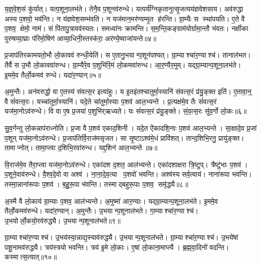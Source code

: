 य॒ज्ञ॒वे॒श॒सं कु॑र्यात्।
यत्प॒शूना॒लभ॑ते।
तेनै॒व प॒शूनव॑रुन्धे।
यत्पर्य॑ग्निकृतानुत्सृ॒जत्यय॑ज्ञवेशसाय।
अव॑रुद्धा अस्य प॒शवो॒ भव॑न्ति।
न य॑ज्ञवेश॒सम्भ॑वति।
न यज॑मान॒मर॑ण्यम्मृ॒त ह॑रन्ति।
ग्रा॒म्यैः स स्था॑पयति।
ए॒ते वै प॒शव॒ क्षेमो॒ नाम॑।
सं पि॑तापु॒त्रावव॑स्यतः।
समध्वा॑नः क्रामन्ति।
स॒म॒न्ति॒कङ्ग्राम॑योर्ग्रामा॒न्तौ भ॑वतः।
नर्क्षीका पुरुषव्या॒घ्राः प॑रिमो॒षिण॑ आव्या॒धिनी॒स्तस्क॑रा॒ अर॑ण्ये॒ष्वाजा॑यन्ते॥४॥\anuvakamend[ऋ॒तव॑ स्यातामुत्सृ॒जेत्स्य॑त॒स्त्रीणि॑ च]

प्र॒जाप॑तिरकामयतो॒भौ लो॒कावव॑ रुन्धी॒येति॑।
स ए॒तानु॒भयान्प॒शून॑पश्यत्।
ग्रा॒म्याश्चा॑र॒ण्याश्च॑।
तानाल॑भत।
तैर्वै स उ॒भौ लो॒काववा॑रुन्ध।
ग्रा॒म्यैरे॒व प॒शुभि॑रि॒मं लो॒कमवा॑रुन्ध।
आ॒र॒ण्यैर॒मुम्।
यद्ग्रा॒म्यान्प॒शूना॒लभ॑ते।
इ॒ममे॒व तैर्लो॒कमव॑ रुन्धे।
यदा॑र॒ण्यान्॥५॥

अ॒मुन्तैः।
अन॑वरुद्धो॒ वा ए॒तस्य॑ संवत्स॒र इत्या॑हुः।
य इ॒तइ॑तश्चातुर्मा॒स्यानि॑ संवत्स॒रं प्र॑यु॒ङ्क्त इति॑।
ए॒तावा॒न्॒ वै सं॑वत्स॒रः।
यच्चा॑तुर्मा॒स्यानि॑।
यदे॒ते चा॑तुर्मा॒स्याः प॒शव॑ आल॒भ्यन्ते।
प्र॒त्यक्ष॑मे॒व तैः सं॑वत्स॒रं यज॑मा॒नोऽव॑रुन्धे।
वि वा ए॒ष प्र॒जया॑ प॒शुभि॑र्‌ऋध्यते।
यः सं॑वत्स॒रं प्र॑यु॒ङ्क्ते।
सं॒व॒त्स॒रः सु॑व॒र्गो लो॒कः॥६॥

सु॒व॒र्गन्तु लो॒कन्नाप॑राध्नोति।
प्र॒जा वै प॒शव॑ एकाद॒शिनी।
यदे॒त ऐ॑कादशि॒नाः प॒शव॑ आल॒भ्यन्ते।
सा॒क्षादे॒व प्र॒जां प॒शून् यज॑मा॒नोऽव॑रुन्धे।
प्र॒जाप॑तिर्वि॒राज॑मसृजत।
सा सृ॒ष्टाऽश्व॑मे॒धं प्रावि॑शत्।
तान्द॒शिभि॒रनु॒ प्रायु॑ङ्क्त।
तामाप्नोत्।
तामा॒प्त्वा द॒शिभि॒रवा॑रुन्ध।
यद्द॒शिन॑ आल॒भ्यन्ते॥७॥

वि॒राज॑मे॒व तैरा॒प्त्वा यज॑मा॒नोऽव॑रुन्धे।
एका॑दश द॒शत॒ आल॑भ्यन्ते।
एका॑दशाक्षरा त्रि॒ष्टुप्।
त्रैष्टु॑भाः प॒शव॑।
प॒शूने॒वाव॑रुन्धे।
वै॒श्व॒दे॒वो वा अश्व॑।
ना॒ना॒दे॒व॒त्या प॒शवो॑ भवन्ति।
अश्व॑स्य सर्व॒त्वाय॑।
नाना॑रूपा भवन्ति।
तस्मा॒न्नाना॑रूपाः प॒शव॑।
ब॒हु॒रू॒पा भ॑वन्ति।
तस्माद्बहुरू॒पाः प॒शव॒ समृ॑द्ध्यै॥८॥\anuvakamend[आ॒र॒ण्याँल्लो॒को द॒शिन॑ आल॒भ्यन्ते॒ नाना॑रूपाः प॒शवो॒ द्वे च॑]

अ॒स्मै वै लो॒काय॑ ग्रा॒म्याः प॒शव॒ आल॑भ्यन्ते।
अ॒मुष्मा॑ आर॒ण्याः।
यद्ग्रा॒म्यान्प॒शूना॒लभ॑ते।
इ॒ममे॒व तैर्लो॒कमव॑रुन्धे।
यदा॑र॒ण्यान्।
अ॒मुन्तैः।
उ॒भयान्प॒शूनाल॑भते।
गा॒म्याश्चा॑र॒ण्याश्च॑।
उ॒भयोर्लो॒कयो॒रव॑रुद्ध्यै।
उ॒भयान्प॒शूनाल॑भते॥९॥

ग्रा॒म्याश्चा॑र॒ण्याश्च॑।
उ॒भय॑स्या॒न्नाद्य॒स्याव॑रुद्ध्यै।
उ॒भयान्प॒शूनाल॑भते।
ग्रा॒म्याश्चा॑र॒ण्याश्च॑।
उ॒भये॑षां पशू॒नामव॑रुद्ध्यै।
त्रय॑स्त्रयो भवन्ति।
त्रय॑ इ॒मे लो॒काः।
ए॒षां लो॒काना॒माप्त्यै।
ब्र॒ह्म॒वा॒दिनो॑ वदन्ति।
कस्मात्स॒त्यात्॥१०॥

